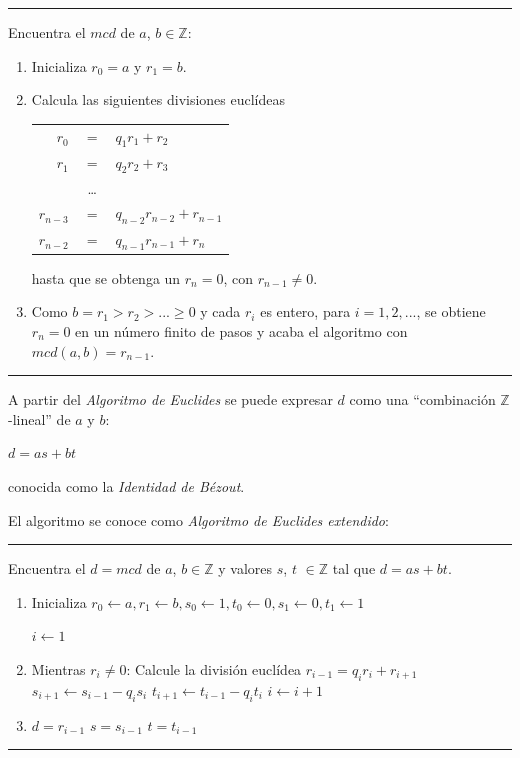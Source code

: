 \hfil


\rule{\textwidth}{1pt}
\begin{algorithm}[Euclides]
	Encuentra el $mcd$ de $a$, $b \in \mathbb{Z}$:
	
	\begin{enumerate}
		\item Inicializa $r_0 = a$ y $r_1 = b$.
		
		\item Calcula las siguientes divisiones euclídeas
		
		\begin{tabular}{rcl}
			$r_0$ & $=$ & $q_1 r_1 + r_2$ \\
			$r_1$ & $=$ & $q_2 r_2 + r_3$ \\
			& \dots & \\
			$r_{n-3}$ & $=$ & $q_{n-2} r_{n-2} + r_{n-1}$ \\
			$r_{n-2}$ & $=$ & $q_{n-1} r_{n-1} + r_{n}$ \\
		\end{tabular}
		
		hasta que se obtenga un $r_n = 0$, con $r_{n-1} \neq 0$.
		
		\item Como $b = r_1 > r_2 > ... \geq 0$ y cada $r_i$ es entero, para $i = 1, 2, ...$, se obtiene $r_n = 0$ en un número finito de pasos y acaba el algoritmo con $mcd(a,b) = r_{n-1}$.
		
	\end{enumerate}
\end{algorithm}
\rule{\textwidth}{1pt}

\hfil

A partir del \textit{Algoritmo de Euclides} se puede expresar $d$ como una ``combinación $\mathbb{Z}$-lineal'' de $a$ y $b$:
\begin{center}
	$d = as + bt$
\end{center}
conocida como la \textit{Identidad de Bézout}.

\hfil

El algoritmo se conoce como \textit{Algoritmo de Euclides extendido}:

\rule{\textwidth}{1pt}
\begin{algorithm}
	Encuentra el $d = mcd$ de $a$, $b \in \mathbb{Z}$ y valores $s$, $t$ $\in \mathbb{Z}$ tal que $d = as + bt$.
	\begin{enumerate}
		\item Inicializa ${\displaystyle r_{0}\gets a,r_{1}\gets b,s_{0}\gets 1,t_{0}\gets 0,s_{1}\gets 0,t_{1}\gets 1}$
		
		$i\gets 1$
		
		\item Mientras $r_i \neq 0$:
			\subitem Calcule la división euclídea $r_{i-1} = q_i r_i + r_{i+1}$
			\subitem ${\displaystyle s_{i+1}\gets s_{i-1}-q_{i}s_{i}}$
			\subitem ${\displaystyle t_{i+1}\gets t_{i-1}-q_{i}t_{i}}$
			\subitem $i \gets i+1$
		
		\item $d = r_{i-1}$	\quad	$s = s_{i-1}$ \quad  $t = t_{i-1}$
	\end{enumerate}
\end{algorithm}
\rule{\textwidth}{1pt}


